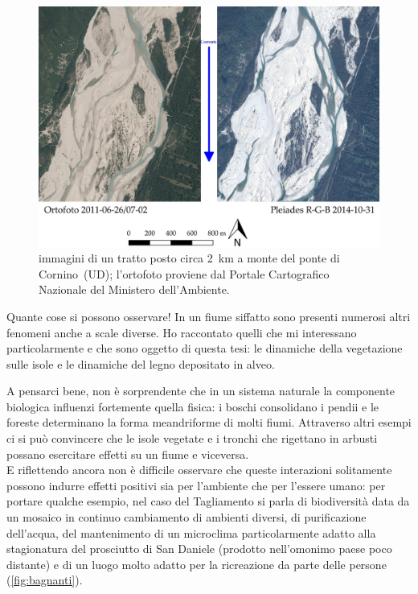 \begin{figure}
	\centering
	\includegraphics[width=\textwidth]{files/confronto_immagini_erosione_isole.jpeg}
	\caption[immagini di un tratto posto circa \SI{2}{\kilo\m} a monte del ponte di Cornino]{immagini di un tratto posto circa \SI{2}{\kilo\m} a monte del ponte di Cornino~(UD); l'ortofoto proviene dal Portale Cartografico Nazionale del Ministero dell'Ambiente.
	}
	\label{fig:confronto-imm-prefaz}
\end{figure}


Quante cose si possono osservare! In un fiume siffatto sono presenti numerosi altri fenomeni anche a scale diverse.
Ho raccontato quelli che mi interessano particolarmente e che sono oggetto di questa tesi: le dinamiche della vegetazione sulle isole e le dinamiche del legno depositato in alveo.

\medskip
A pensarci bene, non è sorprendente che in un sistema naturale la componente biologica influenzi fortemente quella fisica: i boschi consolidano i pendii e le foreste determinano la forma meandriforme di molti fiumi. Attraverso altri esempi ci si può convincere che le isole vegetate e i tronchi che rigettano in arbusti possano esercitare effetti su un fiume e viceversa. 
\\
E riflettendo ancora non è difficile osservare che queste interazioni solitamente possono indurre effetti positivi sia per l'ambiente che per l'essere umano: per portare qualche esempio, nel caso del Tagliamento si parla di biodiversità data da un mosaico in continuo cambiamento di ambienti diversi, di purificazione dell'acqua, del mantenimento di un microclima particolarmente adatto alla stagionatura del prosciutto di San Daniele (prodotto nell'omonimo paese poco distante) e di un luogo molto adatto per la ricreazione da parte delle persone (\cref{fig:bagnanti}).

